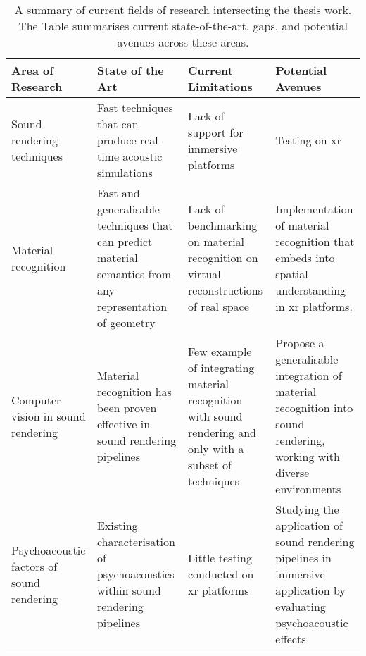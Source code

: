 {
\renewcommand{\arraystretch}{1.5}
\begin{table}[htbp]
    \centering
    \caption[A summary of current fields of research intersecting the thesis work]{A summary of current fields of research intersecting the thesis work. The Table summarises current state-of-the-art, gaps, and potential avenues across these areas.}
    \label{tab:lit-review-summary}
    \begin{tabularx}{\linewidth}{YYYY}
    \toprule
    Area of Research & State of the Art & Current Limitations & Potential Avenues \\ \midrule
    Sound rendering techniques & Fast techniques that can produce real-time acoustic simulations & Lack of support for immersive platforms & Testing on \acrshort{xr}  \\
    Material recognition & Fast and generalisable techniques that can predict material semantics   from any representation of geometry &
      Lack of benchmarking on material recognition on virtual reconstructions   of real space &
      Implementation of material recognition that embeds into spatial   understanding in \acrshort{xr} platforms. \\
    Computer vision in sound rendering &
      Material recognition has been proven effective in sound rendering   pipelines &
      Few example of integrating material recognition with sound rendering and   only with a subset of techniques &
      Propose a generalisable integration of material recognition into sound   rendering, working with diverse environments \\
    Psychoacoustic factors of sound rendering &
      Existing characterisation of psychoacoustics within sound rendering   pipelines &
      Little testing conducted on \acrshort{xr} platforms &
      Studying the application of sound rendering pipelines in immersive   application by evaluating psychoacoustic effects \\ \bottomrule
    \end{tabularx}
\end{table}

}